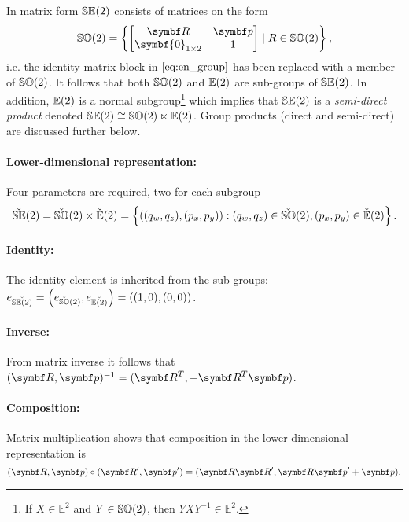 In matrix form ${\mathbb{SE}(2)}$ consists of matrices on the form
\begin{equation}
  \label{eq:se2_matrix}
  \SOtwo = \left\{ \begin{bmatrix}
    \bR & \bp \\ \symbf{0}_{1 \times 2} & 1
  \end{bmatrix} \mid R \in \SOtwo \right\},
\end{equation}
i.e. the identity matrix block in $\eqref{eq:en_group}$ has been replaced with a member of ${\mathbb{SO}(2)}$. It follows that both ${\mathbb{SO}(2)}$ and ${\mathbb{E}(2)}$ are sub-groups of ${\mathbb{SE}(2)}$. In addition, ${\mathbb{E}(2)}$ is a normal subgroup\footnote{If $X \in \mathbb{E}^2$ and $Y \in {\mathbb{SO}(2)}$, then $Y X Y^{-1} \in \mathbb{E}^2$.} which implies that ${\mathbb{SE}(2)}$ is a \emph{semi-direct product} denoted ${\mathbb{SE}(2)} \cong {\mathbb{SO}(2)} \ltimes {\mathbb{E}(2)}$. Group products (direct and semi-direct) are discussed further below.

\paragraph{Lower-dimensional representation:} Four parameters are required, two for each subgroup
\begin{equation}
  \check{\mathbb{SE}}(2) = \check{\mathbb{SO}}(2)  \times \check{\mathbb{E}}(2) = \left\{ ((q_w, q_z), (p_x, p_y)) : (q_w, q_z) \in \check{\mathbb{SO}}(2) , (p_x, p_y) \in \check{\mathbb{E}}(2) \right\}.
\end{equation}

\paragraph{Identity:} The identity element is inherited from the sub-groups: $e_{\check{{\mathbb{SE}(2)}}} = \left( e_{\check{\mathbb{SO}}(2)}, e_{\check{{\mathbb{E}(2)}}} \right) = ((1, 0), (0, 0))$.

\paragraph{Inverse:} From matrix inverse it follows that $(\bR, \bp)^{-1} = (\bR^T, -\bR^T \bp)$.

\paragraph{Composition:} Matrix multiplication shows that composition in the lower-dimensional representation is
\begin{equation}
  (\bR, \bp) \circ (\bR', \bp') = (\bR \bR', \bR \bp' + \bp).
\end{equation}

